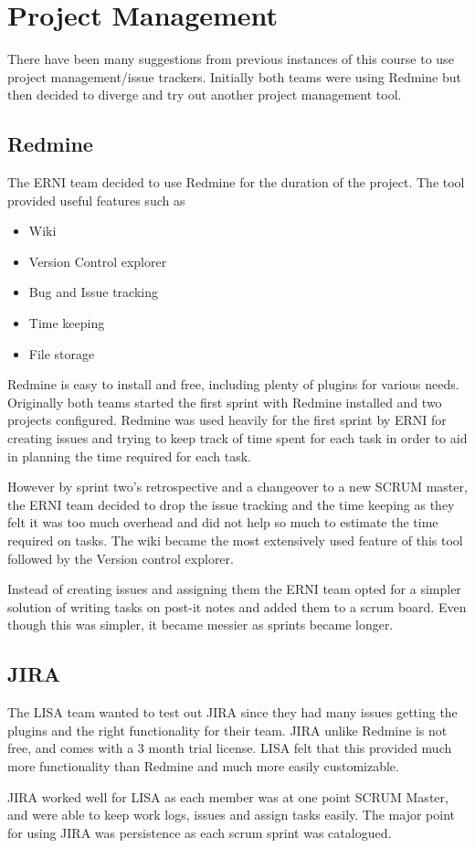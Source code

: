 \section{Project Management}

There have been many suggestions from previous instances of this course to use project management/issue trackers. Initially both teams were using Redmine but then decided to diverge and try out another project management tool. 

\subsection{Redmine}

The ERNI team decided to use Redmine for the duration of the project. The tool provided useful features such as
\begin{itemize}
\item Wiki
\item Version Control explorer
\item Bug and Issue tracking
\item Time keeping
\item File storage
\end{itemize} 

Redmine is easy to install and free, including plenty of plugins for various needs. Originally both teams started the first sprint with Redmine installed and two projects configured. Redmine was used heavily for the first sprint by ERNI for creating issues and trying to keep track of time spent for each task in order to aid in planning the time required for each task. 

However by sprint two's retrospective and a changeover to a new SCRUM master, the ERNI team decided to drop the issue tracking and the time keeping as they felt it was too much overhead and did not help so much to estimate the time required on tasks. The wiki became the most extensively used feature of this tool followed by the Version control explorer. 

Instead of creating issues and assigning them the ERNI team opted for a simpler solution of writing tasks on post-it notes and added them to a scrum board. Even though this was simpler, it became messier as sprints became longer.

\subsection{JIRA}

The LISA team wanted to test out JIRA since they had many issues getting the plugins and the right functionality for their team. JIRA unlike Redmine is not free, and comes with a 3 month trial license. LISA felt that this provided much more functionality than Redmine and much more easily customizable.

JIRA worked well for LISA as each member was at one point SCRUM Master, and were able to keep work logs, issues and assign tasks easily. The major point for using JIRA was persistence as each scrum sprint was catalogued.